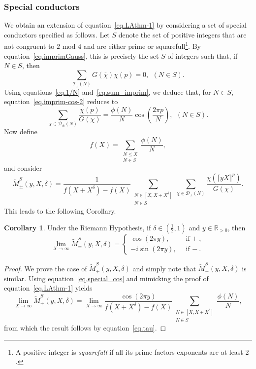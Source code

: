 \documentclass{amsart}
\theoremstyle{definition}
\newtheorem {corollary}[theorem]{Corollary}
\numberwithin{equation}{section}
\begin{document}
\subsubsection{Special conductors}\label{s:special-short}
We obtain an extension of equation~\eqref{eq.LAthm-1} by considering a set of special conductors specified as follows.  
Let $S$ denote the set of positive integers that are not congruent to $2$ mod $4$ and are either prime or squarefull\footnote{A positive integer is {\em squarefull} if all its prime factors exponents are at least $2$.}. 
By equation~\eqref{eq.imprimGauss},
this is precisely the set $S$ of integers such that, if $N \in S$, then
\begin{equation} \label{eq.sum_imprim}
    \sum_{\mathcal{I}_\pm(N)} G(\overline{\chi}) \chi(p) = 0, \ \ (N\in S).
\end{equation}
Using equations~\eqref{eq.1/N} and~\eqref{eq.sum_imprim}, we deduce that, for $N \in S$, equation~\eqref{eq.imprim-cos-2} reduces to 
\begin{equation} \label{eq.special_cos}
    \sum_{\chi \in \mathcal D_\pm(N)} \frac{\chi(p)}{G(\chi)}  = \frac{\phi(N)}{N}\cos\left(\frac{2\pi p}{N} \right), \ \ (N\in S).
\end{equation}
Now define 
\begin{equation}\label{eq.tau}
    f(X) = \sum_{\substack{N \leq X \\ N \in S}} \frac{\phi(N)}{N},
\end{equation}
and consider
\begin{equation}
    \widetilde{M}_{\pm}^S(y, X, \delta) = \frac{1}{f(X+X^\delta) - f(X)} \sum_{\substack{N \in [X, X+X^\delta] \\ N \in S}} \sum_{\chi \in \mathcal{D}_\pm(N)} \frac{\chi(\lceil yX\rceil^p)}{G(\chi)}. 
\end{equation}
This leads to the following Corollary.
\begin{corollary}
Under the Riemann Hypothesis,
if $\delta\in(\frac12,1)$ and $y\in\mathbb{R}_{>0}$, then
\begin{equation}\label{eq.moreconductors-1}
\lim_{X\rightarrow\infty}\widetilde{M}^S_{\pm}(y,X,\delta)= \begin{cases}
\cos(2\pi y), & \text{ if $+$},\\
-i\sin(2\pi y), & \text{ if $-$}.
\end{cases}
\end{equation}
\end{corollary}
\begin{proof}
We prove the case of $\widetilde{M}_+^S(y,X,\delta)$ and simply note that $\widetilde{M}_-^S(y,X,\delta)$ is similar. Using equation~\eqref{eq.special_cos} and mimicking the proof of equation~\eqref{eq.LAthm-1} yields 
\begin{equation}\label{eq.togeneralize}
\lim_{X \to \infty} \widetilde{M}^S_{+}(y,X,\delta)= \lim_{X \to \infty} \frac{\cos(2\pi y)}{f(X+X^\delta) - f(X)}\sum_{\substack{N \in [X,X+X^\delta] \\ N \in S}} \frac{\phi(N)}{N},
\end{equation}
from which the result follows by equation~\eqref{eq.tau}. 
\end{proof}
\end{document}
